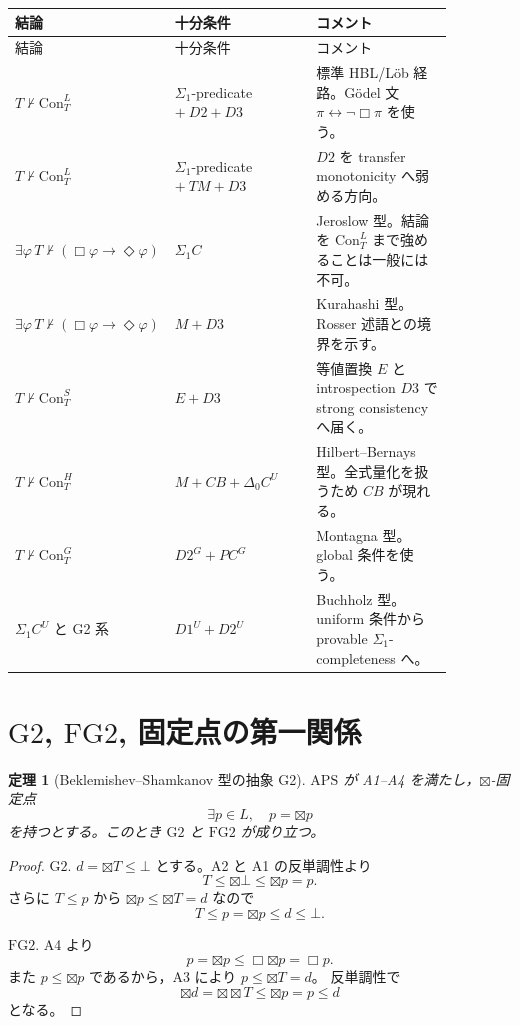 ﻿\documentclass[a4paper,10pt]{ltjsarticle}
\newtheorem{theorem}{定理}
\newcommand{\APS}{\mathrm{APS}}
\newcommand{\Gtwo}{\mathrm{G2}}
\newcommand{\FGtwo}{\mathrm{FG2}}
\newcommand{\Con}{\mathrm{Con}}
\newcommand{\Boxop}{\Box}
\newcommand{\Btx}{\boxtimes}
\newcommand{\Dia}{\Diamond}
\newcommand{\Top}{T}
\newcommand{\Bot}{\bot}
\begin{document}
\begin{longtable}{>{\raggedright\arraybackslash}p{0.24\linewidth}
>{\raggedright\arraybackslash}p{0.32\linewidth}
>{\raggedright\arraybackslash}p{0.31\linewidth}}
\toprule
結論 & 十分条件 & コメント \\
\midrule
\endfirsthead
\toprule
結論 & 十分条件 & コメント \\
\midrule
\endhead
\(T\nvdash\Con_T^L\) &
\(\Sigma_1\)-predicate \(+\ D2+D3\) &
標準 HBL/Löb 経路。Gödel 文 \(\pi\leftrightarrow\neg\Boxop\pi\) を使う。\\
\(T\nvdash\Con_T^L\) &
\(\Sigma_1\)-predicate \(+\ TM+D3\) &
\(D2\) を transfer monotonicity へ弱める方向。\\
\(\exists\varphi\,T\nvdash(\Boxop\varphi\to\Dia\varphi)\) &
\(\Sigma_1 C\) &
Jeroslow 型。結論を \(\Con_T^L\) まで強めることは一般には不可。\\
\(\exists\varphi\,T\nvdash(\Boxop\varphi\to\Dia\varphi)\) &
\(M+D3\) &
Kurahashi 型。Rosser 述語との境界を示す。\\
\(T\nvdash\Con_T^S\) &
\(E+D3\) &
等値置換 \(E\) と introspection \(D3\) で strong consistency へ届く。\\
\(T\nvdash\Con_T^H\) &
\(M+CB+\Delta_0 C^U\) &
Hilbert--Bernays 型。全式量化を扱うため \(CB\) が現れる。\\
\(T\nvdash\Con_T^G\) &
\(D2^G+PC^G\) &
Montagna 型。global 条件を使う。\\
\(\Sigma_1 C^U\) と G2 系 & \(D1^U+D2^U\) &
Buchholz 型。uniform 条件から provable \(\Sigma_1\)-completeness へ。\\
\bottomrule
\end{longtable}

\section{\(\Gtwo\), \(\FGtwo\), 固定点の第一関係}

\begin{theorem}[Beklemishev--Shamkanov 型の抽象 G2]
\(\APS\) が A1--A4 を満たし，\(\Btx\)-固定点
\[
\exists p\in L,\quad p=\Btx p
\]
を持つとする。このとき \(\Gtwo\) と \(\FGtwo\) が成り立つ。
\end{theorem}

\begin{proof}
\(\Gtwo\). \(d=\Btx\Top\le\Bot\) とする。A2 と A1 の反単調性より
\[
\Top\le\Btx\Bot\le\Btx p=p.
\]
さらに \(\Top\le p\) から \(\Btx p\le\Btx\Top=d\) なので
\[
\Top\le p=\Btx p\le d\le\Bot.
\]

\(\FGtwo\). A4 より
\[
p=\Btx p\le\Boxop\Btx p=\Boxop p.
\]
また \(p\le\Btx p\) であるから，A3 により \(p\le\Btx\Top=d\)。
反単調性で
\[
\Btx d=\Btx\Btx\Top\le\Btx p=p\le d
\]
となる。
\end{proof}
\end{document}
